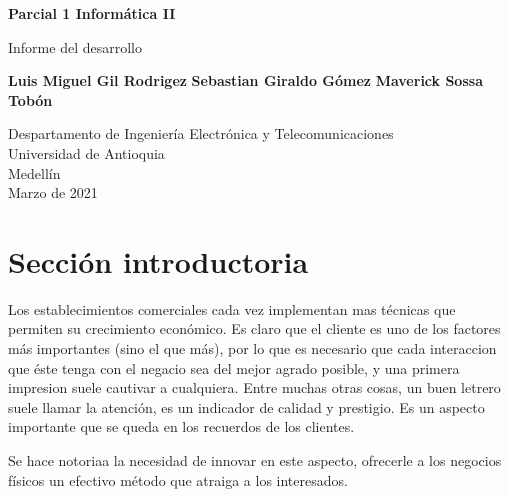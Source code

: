 \documentclass{article}
\begin{document}
\begin{titlepage}
    \begin{center}
        \vspace*{1cm}
            
        \Huge
        \textbf{Parcial 1 Informática II}
            
        \vspace{0.5cm}
        \LARGE
        Informe del desarrollo
            
        \vspace{1.5cm}
            
        \textbf{Luis Miguel Gil Rodrigez}
        \newline
        \textbf{Sebastian Giraldo Gómez}
        \newline
        \textbf{Maverick Sossa Tobón}
        \newline
            
        \vfill
            
        \vspace{0.8cm}
            
        \Large
        Despartamento de Ingeniería Electrónica y Telecomunicaciones\\
        Universidad de Antioquia\\
        Medellín\\
        Marzo de 2021
            
    \end{center}
\end{titlepage}

\tableofcontents
\newpage
\section{Sección introductoria}\label{intro}
Los establecimientos comerciales cada vez implementan mas técnicas que permiten su  crecimiento económico. Es claro que el cliente es uno de los factores más importantes (sino el que más), por lo que es necesario que cada interaccion que éste tenga con el negacio sea del mejor agrado posible, y una primera impresion suele cautivar a cualquiera. Entre muchas otras cosas, un buen letrero suele llamar la atención, es un indicador de calidad y prestigio. Es un aspecto importante que se queda en los recuerdos de los clientes. 
\newline

Se hace notoriaa la necesidad de innovar en este aspecto, ofrecerle a los negocios físicos un efectivo método que atraiga a los interesados.  
\end{document}
